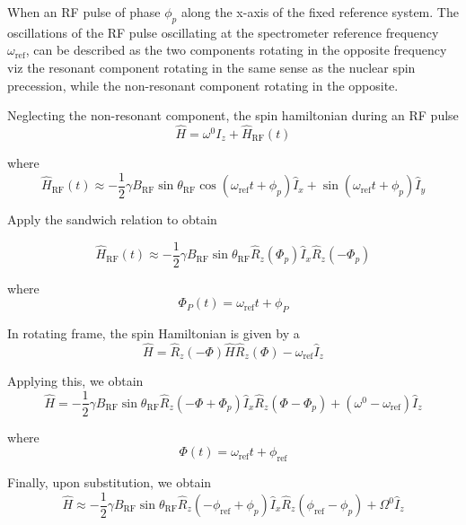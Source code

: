 			When an RF pulse of phase $\phi_p$ along the x-axis of the fixed reference system. The oscillations of the RF pulse oscillating at the spectrometer reference frequency $\omega_\text{ref}$, can be described as the two components rotating in the opposite frequency viz the resonant component rotating in the same sense as the nuclear spin precession, while the non-resonant component rotating in the opposite. 

			Neglecting the non-resonant component, the spin hamiltonian during an RF pulse
			\begin{equation}
			\hat{{H}} = \omega^0 \hat{I_z} + \hat{{H}}_\text{RF}(t)
			\end{equation}

			where 
			\begin{equation}
			\hat{{H}}_\text{RF}(t) \approx - \frac{1}{2} \gamma B_\text{RF} \sin \theta_\text{RF} { \cos ( \omega_\text{ref}t + \phi_p) \hat{I}_x + \sin ( \omega_\text{ref}t + \phi_p) \hat{I}_y } 
			\end{equation}

			Apply the sandwich relation to obtain

			\begin{equation}
			\hat{{H}}_\text{RF}(t) \approx - \frac{1}{2} \gamma B_\text{RF} \sin \theta_\text{RF} \hat{R}_z(\Phi_p) \hat{I}_x \hat{R}_z(-\Phi_p) 
			\end{equation}

			where 
			\begin{equation}
			 \Phi_P(t) = \omega_\text{ref} t + \phi_P
			\end{equation}


			In rotating frame, the spin Hamiltonian is given by a
			\begin{equation}
				\hat{ {H}}  = \hat{R}_z (-\Phi) \hat{{H}} \hat{R}_z (\Phi) - \omega_\text{ref}\hat{I}_z
			\end{equation}

			Applying this, we obtain
			\begin{equation}
			\hat{{{H}}} = - \frac{1}{2} \gamma B_\text{RF} \sin \theta_\text{RF} \hat{R}_z (-\Phi + \Phi_p) \hat{I}_x \hat{R}_z (\Phi - \Phi_p) + (\omega^0 -\omega_\text{ref}) \hat{I}_z
			\end{equation}

			where 
			\begin{equation}
			\Phi (t) = \omega_\text{ref} t + \phi_\text{ref} 
			\end{equation}

			Finally, upon substitution, we obtain
			\begin{equation}
			\hat{{{H}}} \approx - \frac{1}{2} \gamma B_\text{RF} \sin \theta_\text{RF} \hat{R}_z (-\phi_\text{ref} + \phi_p) \hat{I}_x \hat{R}_z (\phi_\text{ref} - \phi_p) + \Omega^0 \hat{I}_z
			\end{equation}

